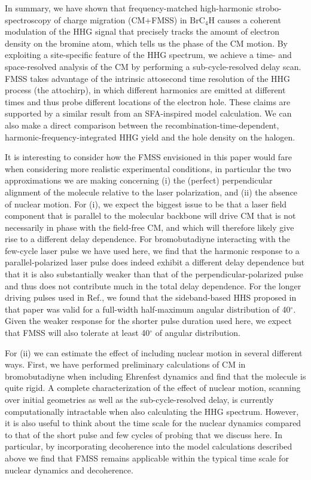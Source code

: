 \documentclass[journal=jacsat,manuscript=article]{achemso}
\begin{document}
\noindent In summary, we have shown that frequency-matched high-harmonic strobo-spectroscopy of charge migration (CM+FMSS) in $\text{BrC}_{4}\text{H}$ causes a coherent modulation of the HHG signal that precisely tracks the amount of electron density on the bromine atom, which tells us the phase of the CM motion. By exploiting a site-specific feature of the HHG spectrum, we achieve a time- and space-resolved analysis of the CM by performing a sub-cycle-resolved delay scan. FMSS takes advantage of the intrinsic attosecond time resolution of the HHG process (the attochirp), in which different harmonics are emitted at different times and thus probe different locations of the electron hole. These claims are supported by a similar result from an SFA-inspired model calculation. We can also make a direct comparison between the recombination-time-dependent, harmonic-frequency-integrated HHG yield and the hole density on the halogen.

It is interesting to consider how the FMSS envisioned in this paper would fare when considering more realistic experimental conditions, in particular the two approximations we are making concerning (i) the (perfect) perpendicular alignment of the molecule relative to the laser polarization, and (ii) the absence of nuclear motion. 
For (i), we expect the biggest issue to be that a laser field component that is parallel to the molecular backbone will drive CM that is not necessarily in phase with the field-free CM, and which will therefore likely give rise to a different delay dependence. For bromobutadiyne interacting with the few-cycle laser pulse we have used here, we find that the harmonic response to a parallel-polarized laser pulse does indeed exhibit a different delay dependence but that it is also substantially weaker than that of the perpendicular-polarized pulse and thus does not contribute much in the total delay dependence. For the longer driving pulses used in Ref.\cite{hamer2022}, we found that the sideband-based HHS proposed in that paper was valid for a full-width half-maximum angular distribution of 40$^{\circ}$. Given the weaker response for the shorter pulse duration used here, we expect that FMSS will also tolerate at least 40$^{\circ}$ of angular distribution.

For (ii) we can estimate the effect of including nuclear motion in several different ways. First, we have performed preliminary calculations of CM in bromobutadiyne when including Ehrenfest dynamics and find  that the molecule is quite rigid. A complete characterization of the effect of nuclear motion,  scanning over initial geometries as well as the sub-cycle-resolved delay, is currently computationally intractable when also calculating the HHG spectrum. However, it is also useful to think about the time scale for the nuclear dynamics compared to that of the short pulse and few cycles of probing that we discuss here. In particular, by incorporating decoherence into the model calculations described above we find that FMSS remains applicable within the typical time scale for nuclear dynamics and decoherence.
\end{document}
